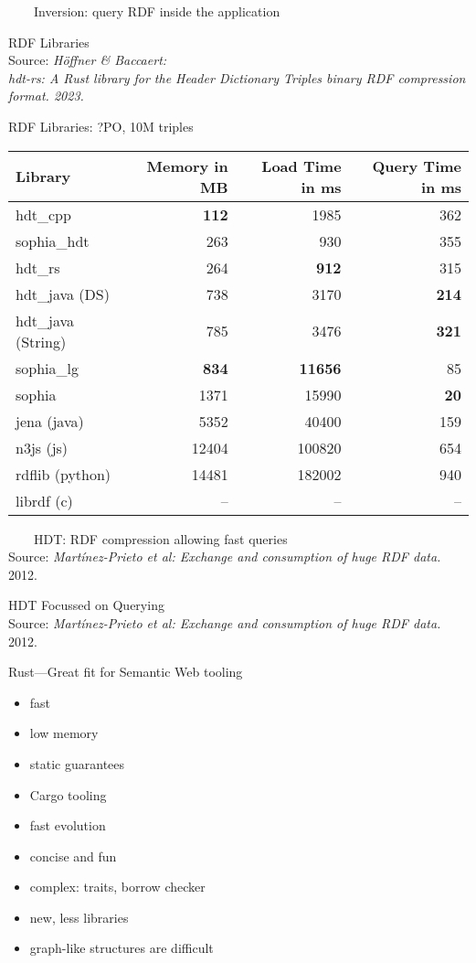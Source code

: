\documentclass[14pt,aspectratio=169]{beamer}
\newcommand{\imageslide}[4][]
{
\begin{frame}[plain]{~~~~#2}
\vspace{0.2em}
\centering\makebox[\linewidth]{\texttt{[image: \#3]}}
\\#1
\note{#4}
\end{frame}
}
\newcommand\pro{\item[$+$]}
\newcommand\con{\item[$-$]}
\begin{document}
\imageslide{Inversion: query RDF inside the application}{img/architecture-simple.pdf}{}

\begin{frame}[plain]{RDF Libraries}
\centering
{}\\
\scriptsize Source: \emph{Höffner \& Baccaert:\\hdt-rs: A Rust library for the Header Dictionary Triples binary RDF compression format. 2023.}
\end{frame}

\begin{frame}[fragile]{RDF Libraries: ?PO, 10M triples}
\centering
\small
\begin{tabular}{lrrr}
\toprule
Library & Memory in MB & Load Time in ms & Query Time in ms \\
\midrule
hdt\_cpp & \textbf{112} & 1985 & 362 \\
sophia\_hdt & 263 & 930 & 355 \\
hdt\_rs & 264 & \textbf{912} & 315 \\
hdt\_java (DS) & 738 & 3170 & \textbf{214} \\
hdt\_java (String) & 785 & 3476 & \textbf{321} \\
\midrule
sophia\_lg & \textbf{834} & \textbf{11656} & 85 \\
sophia & 1371 & 15990 & \textbf{20} \\
jena (java) & 5352 & 40400 & 159 \\
n3js (js) & 12404 & 100820 & 654 \\
rdflib (python) & 14481 & 182002 & 940 \\
librdf (c) & -- & -- & -- \\
\bottomrule
\end{tabular}
\end{frame}

\imageslide[\footnotesize Source: \emph{Martínez-Prieto et al: Exchange and consumption of huge RDF data.} 2012.]{HDT: RDF compression allowing fast queries}{img/bt.png}{}

\begin{frame}[plain]{HDT Focussed on Querying}
\centering
{}\\
\footnotesize Source: \emph{Martínez-Prieto et al: Exchange and consumption of huge RDF data.} 2012.
\end{frame}

\begin{frame}{Rust---Great fit for Semantic Web tooling}
\begin{itemize}
\pro fast
\pro low memory
\pro static guarantees
\pro Cargo tooling
\pro fast evolution
\pro concise and fun
\pause
\con complex: traits, borrow checker
\con new, less libraries
\con graph-like structures are difficult
\end{itemize}
\end{frame}
\end{document}
